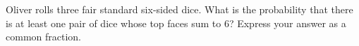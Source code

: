 Oliver rolls three fair standard six-sided dice. What is the probability that there is at least one pair of dice whose top faces sum to $6$? Express your answer as a common fraction.
